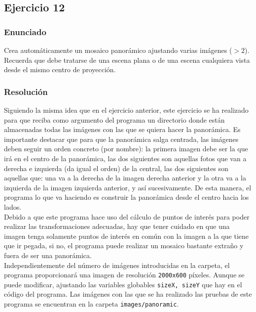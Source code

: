 \documentclass[a4paper,10pt,titlepage,oneside,openright]{book}
\begin{document}
\subsection{Ejercicio 12}

\subsubsection*{Enunciado}
Crea automáticamente un mosaico panorámico ajustando varias imágenes ($>2$). Recuerda que debe tratarse de una escena plana o de una escena cualquiera vista desde el mismo centro de proyección.

\subsubsection*{Resolución}
Siguiendo la misma idea que en el ejercicio anterior, este ejercicio se ha realizado para que reciba como argumento del programa un directorio donde están almacenadas todas las imágenes con las que se quiera hacer la panorámica. Es importante destacar que para que la panorámica salga centrada, las imágenes deben seguir un orden concreto (por nombre): la primera imagen debe ser la que irá en el centro de la panorámica, las dos siguientes son aquellas fotos que van a derecha e izquierda (da igual el orden) de la central, las dos siguientes son aquellas que: una va a la derecha de la imagen derecha anterior y la otra va a la izquierda de la imagen izquierda anterior, y así sucesivamente. De esta manera, el programa lo que va haciendo es construir la panorámica desde el centro hacia los lados. \\

Debido a que este programa hace uso del cálculo de puntos de interés para poder realizar las transformaciones adecuadas, hay que tener cuidado en que una imagen tenga solamente puntos de interés en común con la imagen a la que tiene que ir pegada, si no, el programa puede realizar un mosaico bastante extraño y fuera de ser una panorámica. \\

Independientemente del número de imágenes introducidas en la carpeta, el programa proporcionará una imagen de resolución \texttt{2000x600} píxeles. Aunque se puede modificar, ajustando las variables globables \texttt{sizeX, sizeY} que hay en el código del programa. Las imágenes con las que se ha realizado las pruebas de este programa se encuentran en la carpeta \texttt{images/panoramic}. \\
\end{document}

